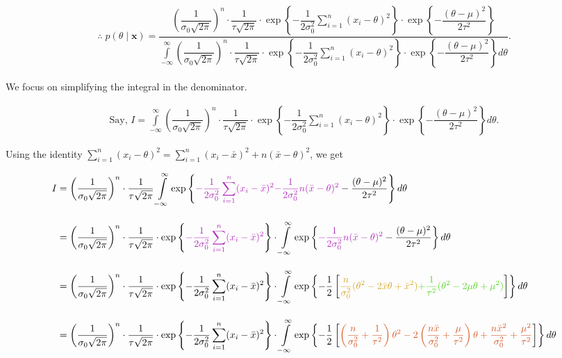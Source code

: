 \documentclass[12pt, a4paper]{article}
\begin{document}
\begin{align*}
\therefore\; p(\theta \mid \mathbf{x}) = \dfrac{\left(\dfrac{1}{\sigma_0\sqrt{2\pi}}\right)^n \cdot \dfrac{1}{\tau\sqrt{2\pi}} \cdot \exp\left\{-\dfrac{1}{2\sigma_0^2}\displaystyle\sum\limits_{i=1}^{n}(x_i-\theta)^2\right\} \cdot \exp\left\{-\dfrac{(\theta-\mu)^2}{2\tau^2}\right\}}{\displaystyle \int\limits_{-\infty}^{\infty} \left(\dfrac{1}{\sigma_0\sqrt{2\pi}}\right)^n \cdot \dfrac{1}{\tau\sqrt{2\pi}} \cdot \exp\left\{-\dfrac{1}{2\sigma_0^2}\sum\limits_{i=1}^{n}(x_i-\theta)^2\right\} \cdot \exp\left\{-\dfrac{(\theta-\mu)^2}{2\tau^2}\right\} d\theta }.
\end{align*}

We focus on simplifying the integral in the denominator.

\begin{align*}
\text{Say, } I = {\displaystyle \int\limits_{-\infty}^{\infty} \left(\dfrac{1}{\sigma_0\sqrt{2\pi}}\right)^n \cdot \dfrac{1}{\tau\sqrt{2\pi}} \cdot \exp\left\{-\dfrac{1}{2\sigma_0^2}\sum\limits_{i=1}^{n}(x_i-\theta)^2\right\} \cdot \exp\left\{-\dfrac{(\theta-\mu)^2}{2\tau^2}\right\} d\theta }.
\end{align*}

\newpage

Using the identity $\sum\limits_{i=1}^{n}(x_i-\theta)^2 = \sum\limits_{i=1}^{n}(x_i-\bar{x})^2 + n(\bar{x}-\theta)^2$, we get

\begin{align*}
I &=
\left(\dfrac{1}{\sigma_0\sqrt{2\pi}}\right)^n \cdot \dfrac{1}{\tau\sqrt{2\pi}} \int\limits_{-\infty}^{\infty} \exp\left\{ \textcolor[HTML]{AE28B8}{
-\dfrac{1}{2\sigma_0^2} \sum\limits_{i=1}^{n} (x_i - \bar{x})^2 } \textcolor[HTML]{AE28B8}{- \dfrac{1}{2\sigma_0^2}n(\bar{x}-\theta)^2} - \dfrac{(\theta-\mu)^2}{2\tau^2} \right\} d\theta \\[1em]
&=
\left(\dfrac{1}{\sigma_0\sqrt{2\pi}}\right)^n \cdot \dfrac{1}{\tau\sqrt{2\pi}} \cdot \exp\left\{ \textcolor[HTML]{AE28B8}{-\dfrac{1}{2\sigma_0^2}\sum\limits_{i=1}^{n}(x_i-\bar{x})^2} \right\} \cdot \int\limits_{-\infty}^{\infty} \exp\left\{ \textcolor[HTML]{AE28B8}{- \dfrac{1}{2\sigma_0^2}n(\bar{x}-\theta)^2} - \dfrac{(\theta-\mu)^2}{2\tau^2} \right\} d\theta \\[1em]
&=
\left(\dfrac{1}{\sigma_0\sqrt{2\pi}}\right)^n \cdot \dfrac{1}{\tau\sqrt{2\pi}} \cdot \exp\left\{ -\dfrac{1}{2\sigma_0^2}\sum\limits_{i=1}^{n}(x_i-\bar{x})^2 \right\} \cdot \int\limits_{-\infty}^{\infty} \exp\left\{ -\dfrac{1}{2}\left[ \textcolor[HTML]{D4A420}{\dfrac{n}{\sigma_0^2}(\theta^2-2\bar{x}\theta+\bar{x}^2)} \textcolor[HTML]{53D420}{+ \dfrac{1}{\tau^2}(\theta^2-2\mu\theta+\mu^2)} \right] \right\} d\theta \\[1em]
&=
\left(\dfrac{1}{\sigma_0\sqrt{2\pi}}\right)^n \cdot \dfrac{1}{\tau\sqrt{2\pi}} \cdot \exp\left\{ -\dfrac{1}{2\sigma_0^2}\sum\limits_{i=1}^{n}(x_i-\bar{x})^2 \right\} \cdot \int\limits_{-\infty}^{\infty} \exp\left\{ -\dfrac{1}{2}\left[ \textcolor[HTML]{D45320}{\left(\dfrac{n}{\sigma_0^2}+\dfrac{1}{\tau^2}\right)\theta^2 - 2\left(\dfrac{n\bar{x}}{\sigma_0^2}+\dfrac{\mu}{\tau^2}\right)\theta + \dfrac{n\bar{x}^2}{\sigma_0^2} + \dfrac{\mu^2}{\tau^2}} \right] \right\} d\theta
\end{align*}
\end{document}
